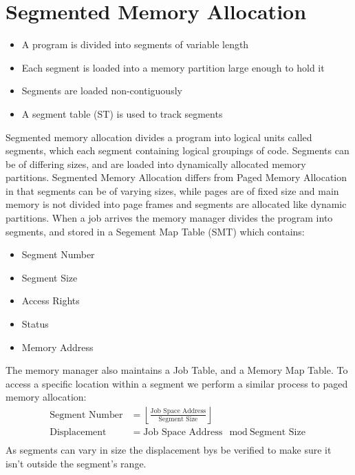 \documentclass[12pt letter]{report}
\begin{document}
\section{Segmented Memory Allocation}


\begin{itemize}
  \item A program is divided into segments of variable length
  \item Each segment is loaded into a memory partition large enough to hold it
  \item Segments are loaded non-contiguously
  \item A segment table (ST) is used to track segments
\end{itemize}

Segmented memory allocation divides a program into logical units called segments, which each segment containing logical groupings of code. Segments can be of differing sizes, and are loaded into dynamically allocated memory partitions. Segmented Memory Allocation differs from Paged Memory Allocation in that segments can be of varying sizes, while pages are of fixed size and main memory is not divided into page frames and segments are allocated like dynamic partitions. When a job arrives the memory manager divides the program into segments, and stored in a Segement Map Table (SMT) which contains:
\begin{itemize}
  \item Segment Number
  \item Segment Size
  \item Access Rights
  \item Status
  \item Memory Address
\end{itemize}
The memory manager also maintains a Job Table, and a Memory Map Table. To access a specific location within a segment we perform a similar process to paged memory allocation:
\begin{align*}
  \text{Segment Number} & = \left\lfloor \frac{\text{Job Space Address}}{\text{Segment Size}} \right\rfloor \\
  \text{Displacement}   & = \text{Job Space Address} \mod \text{Segment Size}                               \\
\end{align*}
As segments can vary in size the displacement bys be verified to make sure it isn't outside the segment's range.
\end{document}
